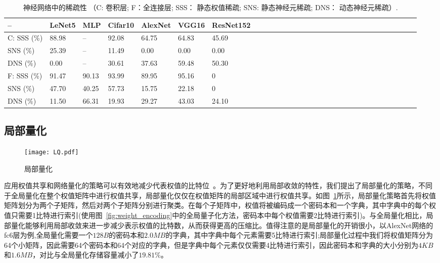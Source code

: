 \begin{table}[b]
\centering
\caption{\footnotesize 神经网络中的稀疏性 （C: 卷积层; F：全连接层; SSS： 静态权值稀疏; SNS: 静态神经元稀疏; DNS： 动态神经元稀疏）.}
\label{tab:sparsities}
\begin{tabular}{@{~}lll@{~}lll@{~}lll@{~}lll@{~}lll@{~}lll@{~}llllllllllll}
\toprule
-- & LeNet5 & MLP & Cifar10 & AlexNet & VGG16 & ResNet152 \\
\midrule
C: SSS (\%)& 88.98 	& -- 	& 92.08 & 64.75 & 64.83 & 45.69 \\
   SNS (\%)& 25.39	& -- 	& 11.49 & 0.00 	& 0.00 	& 0.00 \\
   DNS (\%)& 0.00	& -- 	& 30.61 & 37.63	& 59.48 & 50.30 \\
\hline
F: SSS (\%)& 91.47	& 90.13	& 93.99 & 89.95	& 95.16 & 0 \\
   SNS (\%)& 47.70	& 40.25 & 57.73 & 15.75 & 22.18	& 0 \\
   DNS (\%)& 11.50	& 66.31 & 19.93	& 29.27 & 43.03	& 24.10 \\
\bottomrule
\end{tabular}
\end{table}

\subsection{局部量化}
\begin{figure}[h]
  \centering
  \texttt{[image: LQ.pdf]}
  \caption{局部量化}
  \label{fig:local_quantization}
\end{figure}
应用权值共享和网络量化的策略可以有效地减少代表权值的比特位~\cite{han2015deep}。为了更好地利用局部收敛的特性，我们提出了局部量化的策略，不同于全局量化在整个权值矩阵中进行权值共享，局部量化仅仅在权值矩阵的局部区域中进行权值共享。如图~\ref{fig:local_quantization}所示，局部量化策略首先将权值矩阵划分为两个子矩阵，然后对两个子矩阵分别进行聚类。在每个子矩阵中，权值将被编码成一个密码本和一个字典，其中字典中的每个权值只需要1比特进行索引(使用图~\ref{fig:weight_encoding}中的全局量子化方法，密码本中每个权值需要2比特进行索引)。与全局量化相比，局部量化能够利用局部收敛来进一步减少表示权值的比特数，从而获得更高的压缩比。值得注意的是局部量化的开销很小，以AlexNet网络的fc6层为例,全局量化需要一个$128B$的密码本和$2.0MB$的字典，其中字典中每个元素需要5比特进行索引;局部量化过程中我们将权值矩阵分为64个小矩阵，因此需要64个密码本和64个对应的字典，但是字典中每个元素仅仅需要4比特进行索引，因此密码本和字典的大小分别为$4KB$和$1.6MB$，对比与全局量化存储容量减小了$19.81\%$。


